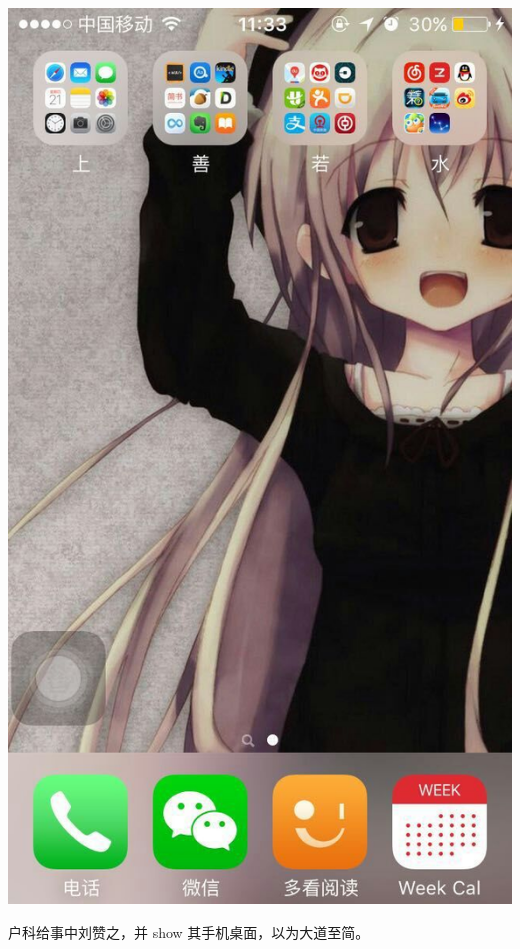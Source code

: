 \documentclass[12pt, a4paper]{book}
\begin{document}
\begin{CJK}{UTF8}{gbsn}
    \begin{center}
    \includegraphics[height=0.3\textheight]{./figure/desktop-2.jpg}
    \end{center}

    户科给事中刘赞之，并 show 其手机桌面，以为大道至简。


\end{CJK}
\end{document}
